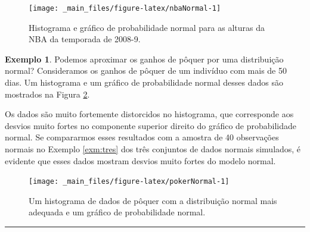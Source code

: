 \documentclass[
]{book}
\theoremstyle{definition}
\theoremstyle{definition}
\newtheorem{example}{Exemplo}[chapter]
\theoremstyle{definition}
\theoremstyle{definition}
\theoremstyle{remark}
\begin{document}
\begin{figure}

{\centering \texttt{[image: \_main\_files/figure-latex/nbaNormal-1]} 

}

\caption{Histograma e gráfico de probabilidade normal para as alturas da NBA da temporada de 2008-9.}\label{fig:nbaNormal}
\end{figure}

\begin{example}
\protect\hypertarget{exm:unnamed-chunk-119}{}{\label{exm:unnamed-chunk-119} }Podemos aproximar os ganhos de pôquer por uma distribuição normal? Consideramos os ganhos de pôquer de um indivíduo com mais de 50 dias. Um histograma e um gráfico de probabilidade normal desses dados são mostrados na Figura \ref{fig:pokerNormal}.
\end{example}

Os dados são muito fortemente distorcidos no histograma, que corresponde aos desvios muito fortes no componente superior direito do gráfico de probabilidade normal. Se compararmos esses resultados com a amostra de 40 observações normais no Exemplo \ref{exm:tres} dos três conjuntos de dados normais simulados, é evidente que esses dados mostram desvios muito fortes do modelo normal.

\begin{figure}

{\centering \texttt{[image: \_main\_files/figure-latex/pokerNormal-1]} 

}

\caption{Um histograma de dados de pôquer com a distribuição normal mais adequada e um gráfico de probabilidade normal.}\label{fig:pokerNormal}
\end{figure}

\begin{center}\rule{0.5\linewidth}{0.5pt}\end{center}
\end{document}
